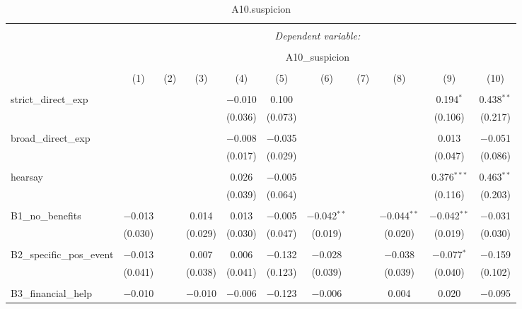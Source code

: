 
\begin{table}[H] \centering 
  \caption{A10.suspicion} 
  \label{} 
\tiny 
\begin{tabular}{@{\extracolsep{4pt}}lcccccccccc} 
\\[-1.8ex]\hline 
\hline \\[-1.8ex] 
 & \multicolumn{10}{c}{\textit{Dependent variable:}} \\ 
\cline{2-11} 
\\[-1.8ex] & \multicolumn{10}{c}{A10\_suspicion} \\ 
\\[-1.8ex] & (1) & (2) & (3) & (4) & (5) & (6) & (7) & (8) & (9) & (10)\\ 
\hline \\[-1.8ex] 
 strict\_direct\_exp &  &  &  & $-$0.010 & 0.100 &  &  &  & 0.194$^{*}$ & 0.438$^{**}$ \\ 
  &  &  &  & (0.036) & (0.073) &  &  &  & (0.106) & (0.217) \\ 
  & & & & & & & & & & \\ 
 broad\_direct\_exp &  &  &  & $-$0.008 & $-$0.035 &  &  &  & 0.013 & $-$0.051 \\ 
  &  &  &  & (0.017) & (0.029) &  &  &  & (0.047) & (0.086) \\ 
  & & & & & & & & & & \\ 
 hearsay &  &  &  & 0.026 & $-$0.005 &  &  &  & 0.376$^{***}$ & 0.463$^{**}$ \\ 
  &  &  &  & (0.039) & (0.064) &  &  &  & (0.116) & (0.203) \\ 
  & & & & & & & & & & \\ 
 B1\_no\_benefits & $-$0.013 &  & 0.014 & 0.013 & $-$0.005 & $-$0.042$^{**}$ &  & $-$0.044$^{**}$ & $-$0.042$^{**}$ & $-$0.031 \\ 
  & (0.030) &  & (0.029) & (0.030) & (0.047) & (0.019) &  & (0.020) & (0.019) & (0.030) \\ 
  & & & & & & & & & & \\ 
 B2\_specific\_pos\_event & $-$0.013 &  & 0.007 & 0.006 & $-$0.132 & $-$0.028 &  & $-$0.038 & $-$0.077$^{*}$ & $-$0.159 \\ 
  & (0.041) &  & (0.038) & (0.041) & (0.123) & (0.039) &  & (0.039) & (0.040) & (0.102) \\ 
  & & & & & & & & & & \\ 
 B3\_financial\_help & $-$0.010 &  & $-$0.010 & $-$0.006 & $-$0.123 & $-$0.006 &  & 0.004 & 0.020 & $-$0.095 \\ 

\end{tabular}
\end{table}
